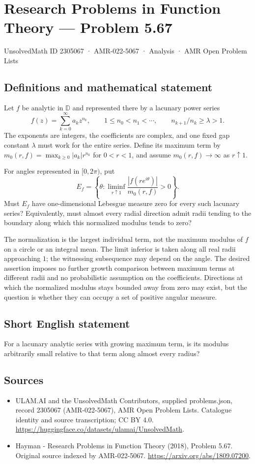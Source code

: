 \documentclass[11pt,a4paper]{article}
\begin{document}
\section*{Research Problems in Function Theory — Problem 5.67}\label{2305067}
{\small UnsolvedMath ID 2305067 · AMR-022-5067 · Analysis · AMR Open Problem Lists}
\subsection{Definitions and mathematical statement}
Let $f$ be analytic in $\mathbb D$ and represented there by a
lacunary power series
\[
 f(z)=\sum_{k=0}^{\infty}a_kz^{n_k},\qquad
 1\leq n_0<n_1<\cdots,\qquad n_{k+1}/n_k\geq\lambda>1.
\]
The exponents are integers, the coefficients are complex, and
one fixed gap constant $\lambda$ must work for the entire
series. Define its maximum term by
$m_0(r,f)=\max_{k\geq0}|a_k|r^{n_k}$ for $0<r<1$,
and assume $m_0(r,f)\to\infty$ as $r\uparrow1$.

For angles represented in $[0,2\pi)$, put
\[
 E_f=\left\{\theta:
       \liminf_{r\uparrow1}
       \frac{|f(re^{i\theta})|}{m_0(r,f)}>0\right\}.
\]
Must $E_f$ have one-dimensional Lebesgue measure zero for
every such lacunary series? Equivalently, must almost every
radial direction admit radii tending to the boundary along
which this normalized modulus tends to zero?

The normalization is the largest individual term, not the
maximum modulus of $f$ on a circle or an integral mean.
The limit inferior is taken along all real radii approaching
$1$; the witnessing subsequence may depend on the angle.
The desired assertion imposes no further growth comparison
between maximum terms at different radii and no probabilistic
assumption on the coefficients. Directions at which the
normalized modulus stays bounded away from zero may exist,
but the question is whether they can occupy a set of
positive angular measure.
\subsection{Short English statement}
For a lacunary analytic series with growing maximum term, is its modulus arbitrarily small relative to that term along almost every radius?
\subsection{Sources}
\begin{itemize}
\item[S1] ULAM.AI and the UnsolvedMath Contributors, supplied problems.json, record 2305067 (AMR-022-5067), AMR Open Problem Lists. Catalogue identity and source transcription; CC BY 4.0.
\url{https://huggingface.co/datasets/ulamai/UnsolvedMath}.
\item[S2] Hayman - Research Problems in Function Theory (2018), Problem 5.67. Original source indexed by AMR-022-5067.
\url{https://arxiv.org/abs/1809.07200}.
\end{itemize}
\end{document}
